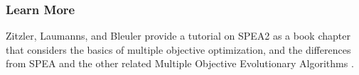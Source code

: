 % 
\subsubsection{Learn More}
Zitzler, Laumanns, and Bleuler provide a tutorial on SPEA2 as a book chapter that considers the basics of multiple objective optimization, and the differences from SPEA and the other related Multiple Objective Evolutionary Algorithms \cite{Zitzler2004}.

